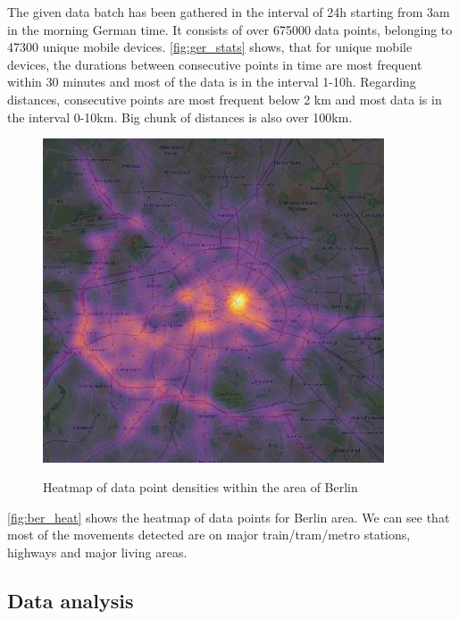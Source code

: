 \FloatBarrier
The given data batch has been gathered in the interval of 24h starting from 3am in the morning German time. It consists of over 675000 data points, belonging to 47300 unique mobile devices. \autoref{fig:ger_stats} shows, that for unique mobile devices, the durations between consecutive points in time are most frequent within 30 minutes and most of the data is in the interval 1-10h. Regarding distances, consecutive points are most frequent below 2 km and most data is in the interval 0-10km. Big chunk of distances is also over 100km.     
\\
\begin{figure}[!ht]
	\centering
	\includegraphics[width=0.9\textwidth]{images/points_berlin_heatmap.png}\\
	\caption{Heatmap of data point densities within the area of Berlin}
	\label{fig:ber_heat}
\end{figure}
\FloatBarrier
\autoref{fig:ber_heat} shows the heatmap of data points for Berlin area. We can see that most of the movements detected are on major train/tram/metro stations, highways and major living areas. 

\subsection{Data analysis}
\label{cha:dataanaly}

